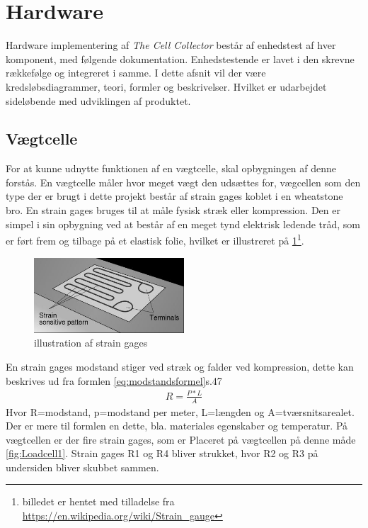   \section{Hardware}
  Hardware implementering af \textit{The Cell Collector} består af enhedstest af hver komponent, med følgende dokumentation. Enhedstestende er lavet i den skrevne rækkefølge og integreret i samme. I dette afsnit vil der være kredsløbsdiagrammer, teori, formler og beskrivelser. Hvilket er udarbejdet sideløbende med udviklingen af produktet. 
 
 \subsection{Vægtcelle}
 For at kunne udnytte funktionen af en vægtcelle, skal opbygningen af denne forstås. En vægtcelle måler hvor meget vægt den udsættes for, vægcellen som den type der er brugt i dette projekt består af strain gages koblet i en wheatstone bro. En strain gages bruges til at måle fysisk stræk eller kompression. Den er simpel i sin opbygning ved at består af en meget tynd elektrisk ledende tråd, som er ført frem og tilbage på et elastisk folie, hvilket er illustreret på \ref{fig:Strain gages}\footnote{billedet er hentet med tilladelse fra  \url{https://en.wikipedia.org/wiki/Strain_gauge}}. 
 \begin{figure}[H]
	\centering
	\includegraphics[width=0.5\textwidth]{billeder/Hardware/straingages1.JPG}
	\caption{illustration af strain gages}
	\label{fig:Strain gages}
\end{figure}
En strain gages modstand stiger ved stræk og falder ved kompression, dette kan beskrives ud fra formlen \ref{eq:modstandsformel}\citep{Websterbog}{s.47}
 \begin{align}
 R=\frac{P*L}{A}
 \label{eq:modstandsformel}
 \end{align}
 Hvor R=modstand, p=modstand per meter, L=længden og A=tværsnitsarealet. Der er mere til formlen en dette, bla. materiales egenskaber og temperatur. På vægtcellen er der fire strain gages, som er Placeret på vægtcellen på denne måde \ref{fig:Loadcell1}. Strain gages R1 og R4 bliver strukket, hvor R2 og R3 på undersiden bliver skubbet sammen.
 
